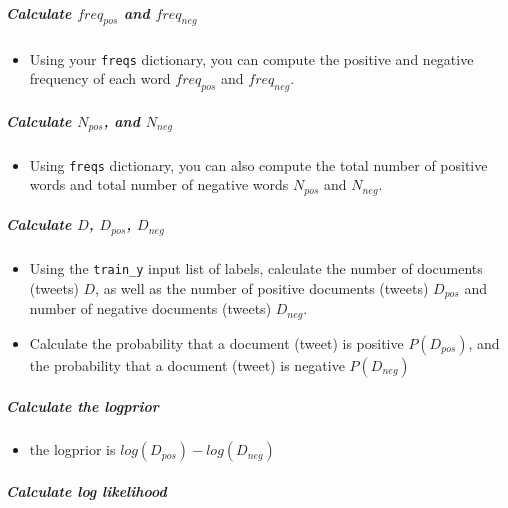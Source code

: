 \documentclass[11pt]{article}
\providecommand{\tightlist}{%
      \setlength{\itemsep}{0pt}\setlength{\parskip}{0pt}}
\begin{document}
\hypertarget{calculate-freq_pos-and-freq_neg}{%
\subparagraph{\texorpdfstring{Calculate \(freq_{pos}\) and
\(freq_{neg}\)}{Calculate freq\_\{pos\} and freq\_\{neg\}}}\label{calculate-freq_pos-and-freq_neg}}

\begin{itemize}
\tightlist
\item
  Using your \texttt{freqs} dictionary, you can compute the positive and
  negative frequency of each word \(freq_{pos}\) and \(freq_{neg}\).
\end{itemize}

\hypertarget{calculate-n_pos-and-n_neg}{%
\subparagraph{\texorpdfstring{Calculate \(N_{pos}\), and
\(N_{neg}\)}{Calculate N\_\{pos\}, and N\_\{neg\}}}\label{calculate-n_pos-and-n_neg}}

\begin{itemize}
\tightlist
\item
  Using \texttt{freqs} dictionary, you can also compute the total number
  of positive words and total number of negative words \(N_{pos}\) and
  \(N_{neg}\).
\end{itemize}

\hypertarget{calculate-d-d_pos-d_neg}{%
\subparagraph{\texorpdfstring{Calculate \(D\), \(D_{pos}\),
\(D_{neg}\)}{Calculate D, D\_\{pos\}, D\_\{neg\}}}\label{calculate-d-d_pos-d_neg}}

\begin{itemize}
\tightlist
\item
  Using the \texttt{train\_y} input list of labels, calculate the number
  of documents (tweets) \(D\), as well as the number of positive
  documents (tweets) \(D_{pos}\) and number of negative documents
  (tweets) \(D_{neg}\).
\item
  Calculate the probability that a document (tweet) is positive
  \(P(D_{pos})\), and the probability that a document (tweet) is
  negative \(P(D_{neg})\)
\end{itemize}

\hypertarget{calculate-the-logprior}{%
\subparagraph{Calculate the logprior}\label{calculate-the-logprior}}

\begin{itemize}
\tightlist
\item
  the logprior is \(log(D_{pos}) - log(D_{neg})\)
\end{itemize}

\hypertarget{calculate-log-likelihood}{%
\subparagraph{Calculate log likelihood}\label{calculate-log-likelihood}}
\end{document}
